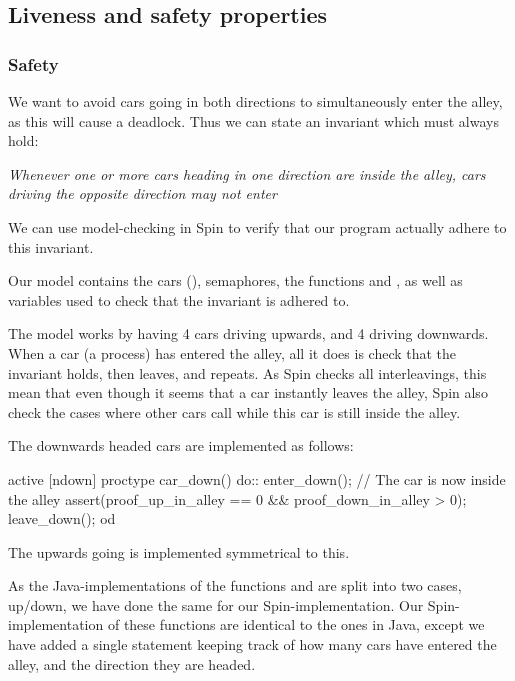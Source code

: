 
\subsection{Liveness and safety properties}
\label{sub:all-proof}
\subsubsection{Safety}
We want to avoid cars going in both directions to simultaneously enter the alley, as this will cause a deadlock. Thus we can state an invariant which must always hold:


\emph{Whenever one or more cars heading in one direction are inside the alley, cars driving the opposite direction may not enter}


We can use model-checking in Spin to verify that our program actually adhere to this invariant.

Our model contains the cars (), semaphores, the functions  and , as well as variables used to check that the invariant is adhered to.

The model works by having 4 cars driving upwards, and 4 driving downwards. When a car (a process) has entered the alley, all it does is check that the invariant holds, then leaves, and repeats. As Spin checks all interleavings, this mean that even though it seems that a car instantly leaves the alley, Spin also check the cases where other cars call  while this car is still inside the alley.

The downwards headed cars are implemented as follows:
\begin{promela}
active [ndown] proctype car_down(){
	do::
		enter_down();
		// The car is now inside the alley
		assert(proof_up_in_alley == 0 && proof_down_in_alley > 0);
		leave_down();
	od
}
\end{promela}

The upwards going is implemented symmetrical to this.

As the Java-implementations of the functions  and  are split into two cases, up/down, we have done the same for our Spin-implementation. Our Spin-implementation of these functions are identical to the ones in Java, except we have added a single statement keeping track of how many cars have entered the alley, and the direction they are headed.

